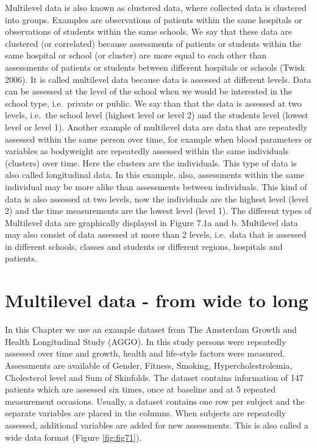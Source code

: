 \documentclass[]{book}
\theoremstyle{definition}
\theoremstyle{definition}
\theoremstyle{definition}
\theoremstyle{remark}
\begin{document}
Multilevel data is also known as clustered data, where collected data is
clustered into groups. Examples are observations of patients within the
same hospitals or observations of students within the same schools. We
say that these data are clustered (or correlated) because assessments of
patients or students within the same hospital or school (or cluster) are
more equal to each other than assessments of patients or students
between different hospitals or schools (Twisk 2006). It is called
multilevel data because data is assessed at different levels. Data can
be assessed at the level of the school when we would be interested in
the school type, i.e.~private or public. We say than that the data is
assessed at two levels, i.e.~the school level (highest level or level 2)
and the students level (lowest level or level 1). Another example of
multilevel data are data that are repeatedly assessed within the same
person over time, for example when blood parameters or variables as
bodyweight are repeatedly assessed within the same individuals
(clusters) over time. Here the clusters are the individuals. This type
of data is also called longitudinal data. In this example, also,
assessments within the same individual may be more alike than
assessments between individuals. This kind of data is also assessed at
two levels, now the individuals are the highest level (level 2) and the
time measurements are the lowest level (level 1). The different types of
Multilevel data are graphically displayed in Figure 7.1a and b.
Multilevel data may also consist of data assessed at more than 2 levels,
i.e.~data that is assessed in different schools, classes and students or
different regions, hospitals and patients.

\section{Multilevel data - from wide to
long}\label{multilevel-data---from-wide-to-long}

In this Chapter we use an example dataset from The Amsterdam Growth and
Health Longitudinal Study (AGGO). In this study persons were repeatedly
assessed over time and growth, health and life-style factors were
measured. Assessments are available of Gender, Fitness, Smoking,
Hypercholestrolemia, Cholesterol level and Sum of Skinfolds. The dataset
contains information of 147 patients which are assessed six times, once
at baseline and at 5 repeated measurement occasions. Usually, a dataset
contains one row per subject and the separate variables are placed in
the columns. When subjects are repeatedly assessed, additional variables
are added for new assessments. This is also called a wide data format
(Figure \ref{fig:fig71}).
\end{document}

